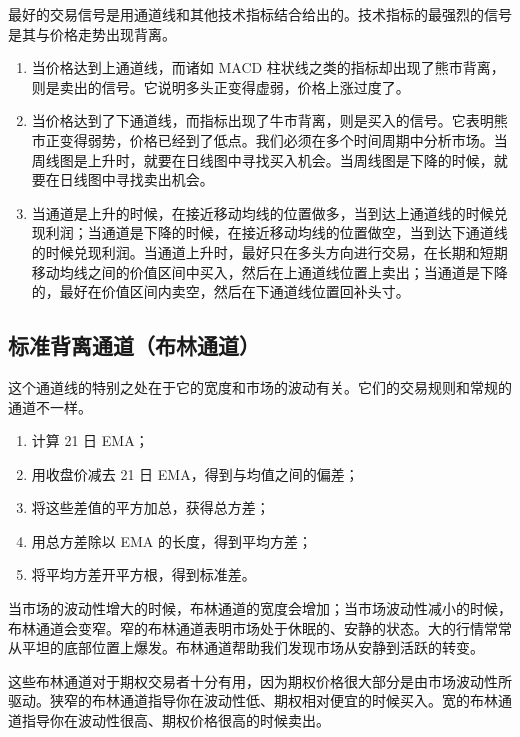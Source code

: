 最好的交易信号是用通道线和其他技术指标结合给出的。技术指标的最强烈的信号是其与价格走势出现背离。
\begin{enumerate}
    \item 当价格达到上通道线，而诸如 MACD 柱状线之类的指标却出现了熊市背离，则是卖出的信号。它说明多头正变得虚弱，价格上涨过度了。
    \item 当价格达到了下通道线，而指标出现了牛市背离，则是买入的信号。它表明熊市正变得弱势，价格已经到了低点。我们必须在多个时间周期中分析市场。当周线图是上升时，就要在日线图中寻找买入机会。当周线图是下降的时候，就要在日线图中寻找卖出机会。
    \item 当通道是上升的时候，在接近移动均线的位置做多，当到达上通道线的时候兑现利润；当通道是下降的时候，在接近移动均线的位置做空，当到达下通道线的时候兑现利润。当通道上升时，最好只在多头方向进行交易，在长期和短期移动均线之间的价值区间中买入，然后在上通道线位置上卖出；当通道是下降的，最好在价值区间内卖空，然后在下通道线位置回补头寸。
\end{enumerate}


\subsection*{标准背离通道（布林通道）}
这个通道线的特别之处在于它的宽度和市场的波动有关。它们的交易规则和常规的通道不一样。
\begin{enumerate}
    \item 计算 21 日 EMA；
    \item 用收盘价减去 21 日 EMA，得到与均值之间的偏差；
    \item 将这些差值的平方加总，获得总方差；
    \item 用总方差除以 EMA 的长度，得到平均方差；
    \item 将平均方差开平方根，得到标准差。
\end{enumerate}

当市场的波动性增大的时候，布林通道的宽度会增加；当市场波动性减小的时候，布林通道会变窄。窄的布林通道表明市场处于休眠的、安静的状态。大的行情常常从平坦的底部位置上爆发。布林通道帮助我们发现市场从安静到活跃的转变。

这些布林通道对于期权交易者十分有用，因为期权价格很大部分是由市场波动性所驱动。狭窄的布林通道指导你在波动性低、期权相对便宜的时候买入。宽的布林通道指导你在波动性很高、期权价格很高的时候卖出。